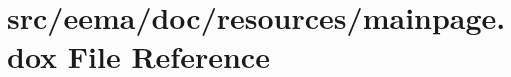 \hypertarget{mainpage_8dox}{}\section{src/eema/doc/resources/mainpage.dox File Reference}
\label{mainpage_8dox}
